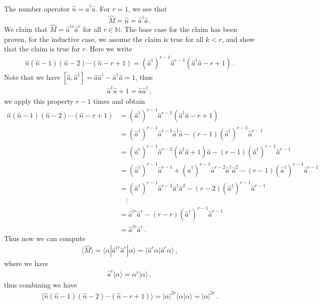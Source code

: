 \documentclass[11pt, oneside]{book}
\theoremstyle{break}
\theoremstyle{break}
\newcommand{\N}{\mathbb{N}}
\begin{document}
The number operator $\hat{n} = \hat{a}^\dagger \hat{a}$. For $r = 1$, we see that 
\begin{align*}
\hat{M} = \hat{n} = \hat{a}^\dagger \hat{a}\,.
\end{align*}
We claim that $\hat{M} = \hat{a}^{\dagger r}\hat{a}^r$ for all $r \in \N$. The base case for the claim has been proven, for the inductive case, we assume the claim is true for all $k< r$, and show that the claim is true for $r$. Here we write
\begin{align*}
\hat{n}(\hat{n}-1) (\hat{n}-2) \cdots (\hat{n}-r+1) = (\hat{a}^{\dagger})^{r-1}\hat{a}^{r-1}(\hat{a}^\dagger \hat{a} - r + 1)\,.
\end{align*}
Note that we have $[\hat{a}, \hat{a}^\dagger]=\hat{a}\hat{a}^\dagger - \hat{a}^\dagger \hat{a} =1$, thus 
\begin{align*}
\hat{a}^\dagger \hat{a} +1= \hat{a}\hat{a}^\dagger  \,,
\end{align*}
we apply this property $r-1$ times and obtain
\begin{align*}
\hat{n}(\hat{n}-1) (\hat{n}-2) \cdots (\hat{n}-r+1) &= 
(\hat{a}^{\dagger})^{r-1}\hat{a}^{r-1}(\hat{a}^\dagger \hat{a} - r + 1)\\
&=(\hat{a}^\dagger)^{r-1}\hat{a}^{r-1}\hat{a}^\dagger \hat{a} - (r-1) (\hat{a}^{\dagger})^{r-1}\hat{a}^{r-1}\\
&= (\hat{a}^\dagger)^{r-1}\hat{a}^{r-2}(\hat{a}^\dagger \hat{a} + 1)\hat{a} - (r-1)(\hat{a}^\dagger)^{r-1}\hat{a}^{r-1}\\
&= (\hat{a}^\dagger)^{r-1}\hat{a}^{r-1}+ (\hat{a}^\dagger)^{r-1}\hat{a}^{r-2}\hat{a}^{\dagger}\hat{a}^2 - (r-1) (\hat{a}^\dagger)^{r-1}\hat{a}^{r-1}\\
&= (\hat{a}^\dagger)^{r-1}\hat{a}^{r-2}\hat{a}^{\dagger}\hat{a}^2 - (r-2) (\hat{a}^\dagger)^{r-1}\hat{a}^{r-1}\\
&{}\quad \vdots\\
&=\hat{a}^{\dagger r} \hat{a}^r- (r-r) (\hat{a}^\dagger)^{r-1}\hat{a}^{r-1} \\
&=\hat{a}^{\dagger r} \hat{a}^r\,.
\end{align*}
Thus now we can compute
\begin{align*}
\langle \hat{M}\rangle = \langle \alpha | \hat{a}^{\dagger r}\hat{a}^r|\alpha \rangle = 
\langle \hat{a}^r \alpha | \hat{a}^r \alpha \rangle \,,
\end{align*}
where we have
\begin{align*}
\hat{a}^r|\alpha\rangle = 
\alpha^r |\alpha\rangle\,,
\end{align*}
thus combining we have
\begin{align*}
\langle \hat{n}(\hat{n}-1)(\hat{n}-2)\cdots (\hat{n}-r+1)\rangle = |\alpha|^{2r}\langle \alpha |\alpha \rangle = |\alpha|^{2r}\,.
\end{align*}
\end{document}
